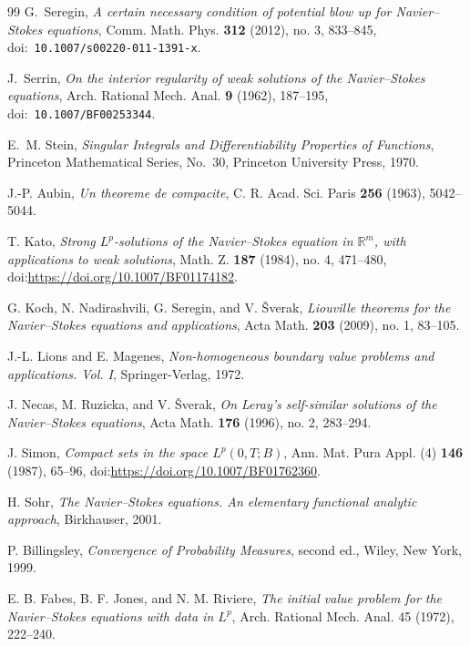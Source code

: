 \documentclass[11pt]{amsart}
\theoremstyle{plain}
\theoremstyle{definition}
\theoremstyle{remark}
\numberwithin{equation}{section}
\begin{document}
\begin{thebibliography}{99}
G.~Seregin,
\emph{A certain necessary condition of potential blow up for Navier--Stokes
 equations},
Comm. Math. Phys. \textbf{312} (2012), no. 3, 833--845,
doi:\ \nolinkurl{10.1007/s00220-011-1391-x}.

J.~Serrin,
\emph{On the interior regularity of weak solutions of the Navier--Stokes
 equations},
Arch. Rational Mech. Anal. \textbf{9} (1962), 187--195,
doi:\ \nolinkurl{10.1007/BF00253344}.

E.~M. Stein,
\emph{Singular Integrals and Differentiability Properties of Functions},
Princeton Mathematical Series, No.~30, Princeton University Press, 1970.

J.-P. Aubin,
\emph{Un theoreme de compacite},
C. R. Acad. Sci. Paris \textbf{256} (1963), 5042--5044.

T. Kato,
\emph{Strong \(L^p\)-solutions of the Navier--Stokes equation in
\(\mathbb R^m\), with applications to weak solutions},
Math. Z. \textbf{187} (1984), no. 4, 471--480,
doi:\url{https://doi.org/10.1007/BF01174182}.

G. Koch, N. Nadirashvili, G. Seregin, and V. \v{S}verak,
\emph{Liouville theorems for the Navier--Stokes equations and applications},
Acta Math. \textbf{203} (2009), no. 1, 83--105.

J.-L. Lions and E. Magenes,
\emph{Non-homogeneous boundary value problems and applications. Vol. I},
Springer-Verlag, 1972.

J. Necas, M. Ruzicka, and V. \v{S}verak,
\emph{On Leray's self-similar solutions of the Navier--Stokes equations},
Acta Math. \textbf{176} (1996), no. 2, 283--294.

J. Simon,
\emph{Compact sets in the space \(L^p(0,T;B)\)},
Ann. Mat. Pura Appl. (4) \textbf{146} (1987), 65--96,
doi:\url{https://doi.org/10.1007/BF01762360}.

H. Sohr,
\emph{The Navier--Stokes equations. An elementary functional analytic approach},
Birkhauser, 2001.

P. Billingsley,
\emph{Convergence of Probability Measures}, second ed.,
Wiley, New York, 1999.

E. B. Fabes, B. F. Jones, and N. M. Riviere,
\emph{The initial value problem for the Navier--Stokes equations with data in
\(L^p\)},
Arch. Rational Mech. Anal. 45 (1972), 222--240.


\end{thebibliography}
\end{document}
